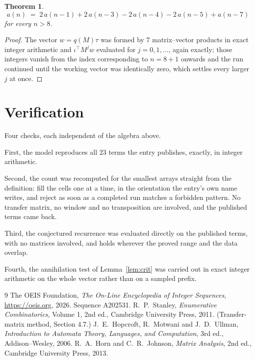 \documentclass[11pt,a4paper]{article}
\theoremstyle{plain}
\newtheorem{theorem}{Theorem}
\theoremstyle{definition}
\begin{document}
\begin{theorem}
\[
a(n)\;=\;2\,a(n-1) + 2\,a(n-3) - 2\,a(n-4) - 2\,a(n-5) + a(n-7)
\]
for every $n>8$.
\end{theorem}

\begin{proof}
The vector $w=q(M)\tau$ was formed by $7$ matrix--vector products in exact integer
arithmetic and $\iota^{\!\top}M^{j}w$ evaluated for $j=0,1,\dots$, again exactly; those
integers vanish from the index corresponding to $n=8+1$ onwards and the run continued
until the working vector was identically zero, which settles every larger $j$ at once.
\end{proof}

\section{Verification}

Four checks, each independent of the algebra above.

First, the model reproduces all $23$ terms the entry publishes, exactly, in integer
arithmetic.

Second, the count was recomputed for the smallest arrays straight from the definition: fill the
cells one at a time, in the orientation the entry's own name writes, and reject as soon as a
completed run matches a forbidden pattern. No transfer matrix, no window and no transposition
are involved, and the published terms came back.

Third, the conjectured recurrence was evaluated directly on the published terms, with no
matrices involved, and holds wherever the proved range and the data overlap.

Fourth, the annihilation test of Lemma~\ref{lem:crit} was carried out in exact integer
arithmetic on the whole vector rather than on a sampled prefix.

\begin{thebibliography}{9}
 The OEIS Foundation, \emph{The On-Line Encyclopedia of Integer
Sequences}, \url{https://oeis.org}, 2026. Sequence A202531.
 R.~P.~Stanley, \emph{Enumerative Combinatorics}, Volume 1, 2nd ed.,
Cambridge University Press, 2011. (Transfer-matrix method, Section 4.7.)
 J.~E.~Hopcroft, R.~Motwani and J.~D.~Ullman, \emph{Introduction to Automata
Theory, Languages, and Computation}, 3rd ed., Addison--Wesley, 2006.
 R.~A.~Horn and C.~R.~Johnson, \emph{Matrix Analysis}, 2nd ed., Cambridge
University Press, 2013.
\end{thebibliography}
\end{document}
